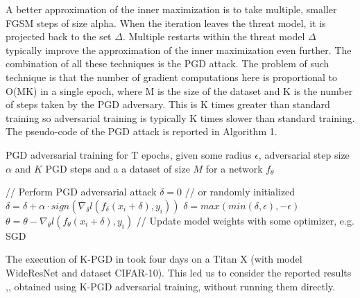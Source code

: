 \documentclass{article}
\begin{document}
A better approximation of the inner maximization is to take multiple, smaller
FGSM steps of size alpha. When the iteration leaves the threat model, it is
projected back to the set $\Delta$. Multiple restarts within the threat model
$\Delta$ typically improve the approximation of the inner maximization even
further. The combination of all these techniques is the PGD attack. The problem
of such technique is that the number of gradient computations here is
proportional to O(MK) in a single epoch, where M is the size of the dataset and
K is the number of steps taken by the PGD adversary. This is K times greater
than standard training so adversarial training is typically K times slower than
standard training. The pseudo-code of the PGD attack is reported in Algorithm 1.
\begin{algorithm}[H]
	\caption{PGD adversarial training for T epochs, given some radius $\epsilon$,
	adversarial step size $\alpha$ and $K$ PGD steps and a a dataset of size $M$
	for a network $f_{\theta}$}
	\begin{algorithmic}[1]
		  \State// Perform PGD adversarial attack
		\State $\delta = 0$ // or randomly initialized  \State
		$\delta = \delta + \alpha\cdot sign(\nabla_{\delta}l(f_{\delta}(x_i +
		\delta), y_i))$ \State $\delta = max(min(\delta, \epsilon), -\epsilon)$
		\EndFor \State$\theta = \theta - \nabla_{\theta}l(f_{\theta}(x_i + \delta),
		y_i)$ // Update model weights with some optimizer, e.g. SGD \EndFor \EndFor
	\end{algorithmic}
\end{algorithm}
The execution of K-PGD in \cite{MadryEtAl2017} took four days on a Titan X (with
model WideResNet and dataset CIFAR-10). This led us to consider the reported
results \cite{ShafahiEtAl2019b},\cite{WongEtAl2020}, obtained using K-PGD
adversarial training, without running them directly.
\end{document}
